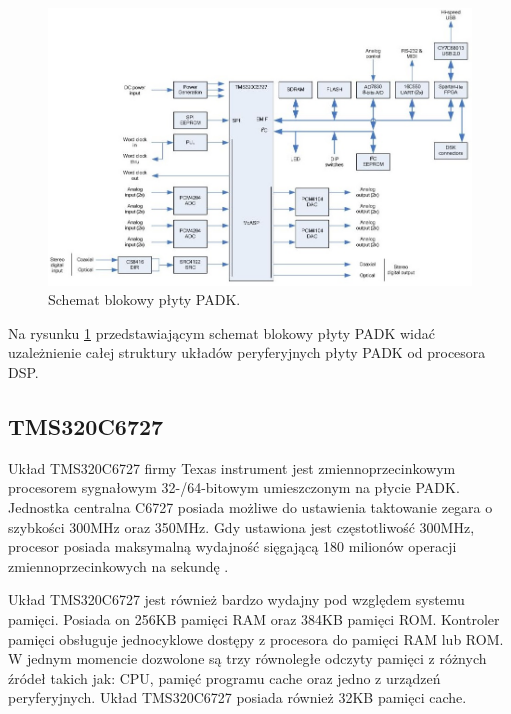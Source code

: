 \begin{figure}[H]
	\centering
	\includegraphics[width=16cm]{./grafiki/real_PADK_block}
	\captionsetup{justification=centering}
	\caption{Schemat blokowy płyty PADK.}
	\label{rys:real_padk}
\end{figure}

Na rysunku \ref{rys:real_padk} przedstawiającym schemat blokowy płyty PADK widać uzależnienie całej struktury układów peryferyjnych płyty PADK od procesora DSP.

\subsection{TMS320C6727}
Układ TMS320C6727 firmy Texas instrument jest zmiennoprzecinkowym procesorem sygnałowym 32-/64-bitowym umieszczonym na płycie PADK. Jednostka centralna C6727 posiada możliwe do ustawienia taktowanie zegara o szybkości 300MHz oraz 350MHz. Gdy ustawiona jest częstotliwość 300MHz, procesor posiada maksymalną wydajność sięgającą 180 milionów operacji zmiennoprzecinkowych na sekundę \cite{dokumentacja_ti6727}.

Układ TMS320C6727 jest również bardzo wydajny pod względem systemu pamięci. Posiada on 256KB pamięci RAM oraz 384KB pamięci ROM. Kontroler pamięci obsługuje jednocyklowe dostępy z procesora do pamięci  RAM lub ROM. W jednym momencie dozwolone są trzy równoległe odczyty pamięci z różnych źródeł takich jak: CPU, pamięć programu cache oraz jedno z urządzeń peryferyjnych. Układ TMS320C6727 posiada również 32KB pamięci cache.

